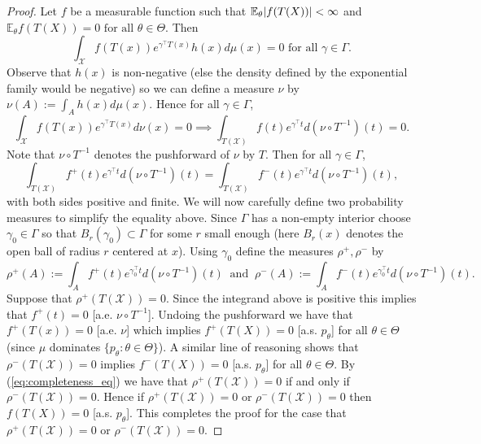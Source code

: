 \begin{proof}
	Let $f$ be a measurable function such that $\mathbb{E}_\theta|f(T(X))| < \infty$ and \(
		\mathbb E_\theta f(T(X)) = 0 \text{ for all } \theta \in \Theta.
	\) Then \[
		\int_\mathcal{X} f(T(x))  e^{\gamma ^\top T(x)} h(x) d\mu(x) = 0  \text{ for all } \gamma \in \Gamma.
	\] Observe that $h(x)$ is non-negative (else the density defined by the exponential family would be negative) so we can define a measure $\nu$ by $\nu(A) := \int_{A} h(x) d\mu(x)$. Hence for all $\gamma \in \Gamma$, \[
		\int_\mathcal{X} f(T(x))  e^{\gamma ^\top T(x)} d\nu(x) = 0 \implies \int_{T(\mathcal X)} f(t) e^{\gamma^\top t} d(\nu \circ T^{-1})(t) = 0. 
	\] Note that $\nu \circ T^{-1}$ denotes the pushforward of $\nu$ by $T$. Then for all $\gamma \in \Gamma$, \begin{equation}
		 \int_{T(\mathcal X)} f^+(t) e^{\gamma^\top t} d(\nu \circ T^{-1})(t) =  \int_{T(\mathcal X)} f^-(t) e^{\gamma^\top t} d(\nu \circ T^{-1})(t), \label{eq:completeness_eq}
	\end{equation} with both sides positive and finite. We will now carefully define two probability measures to simplify the equality above. Since $\Gamma$ has a non-empty interior choose $\gamma_0 \in \Gamma$ so that $B_r(\gamma_0) \subset \Gamma$ for some $r$ small enough (here $B_r(x)$ denotes the open ball of radius $r$ centered at $x$). Using $\gamma_0$ define the measures $\rho^+, \rho^-$ by \[
		\rho^+(A) := \int_{A} f^+(t) e^{\gamma_0^\top t} d(\nu \circ T^{-1})(t) \ \text{ and } \  \rho^-(A) := \int_{A} f^-(t) e^{\gamma_0^\top t} d(\nu \circ T^{-1})(t). 
	\] Suppose that $\rho^+(T(\mathcal X)) = 0$. Since the integrand above is positive this implies that $f^+(t) = 0$ [a.e. $\nu \circ T^{-1}$]. Undoing the pushforward we have that  $f^+(T(x)) = 0$ [a.e. $\nu$] which implies $f^+(T(X)) = 0$ [a.s. $p_\theta$] for all $\theta \in \Theta$ (since $\mu$ dominates $\{p_\theta : \theta \in \Theta \}$). A similar line of reasoning shows that $\rho^-(T(\mathcal X)) = 0$ implies $f^-(T(X)) = 0$ [a.s. $p_\theta$] for all $\theta \in \Theta$. By (\ref{eq:completeness_eq}) we have that $\rho^+(T(\mathcal X)) = 0$ if and only if $\rho^-(T(\mathcal X)) = 0$. Hence if $\rho^+(T(\mathcal X)) = 0$ or $\rho^-(T(\mathcal X)) = 0$ then $f(T(X)) = 0$ [a.s. $p_\theta$]. This completes the proof for the case that $\rho^+(T(\mathcal X)) = 0$ or $\rho^-(T(\mathcal X)) = 0$.
	

\end{proof}
